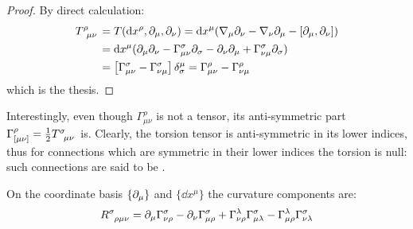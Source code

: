 \begin{proofbox}
  \begin{proof}
    By direct calculation:
    \begin{equation*}
      \begin{split}
        \tensor{T}{^\rho _\mu _\nu}
        &= T(\dd x^\rho, \pa_\mu, \pa_\nu) = \dd x^\mu (\na_\mu \pa_\nu - \na_\nu \pa_\mu - [\pa_\mu, \pa_\nu]) \\
        &= \dd x^\mu (\pa_\mu \pa_\nu - \Gamma^\sigma_{\mu \nu} \pa_\sigma - \pa_\nu \pa_\mu + \Gamma^\sigma_{\nu \mu} \pa_\sigma) \\
        &= \left[ \Gamma^\sigma_{\mu \nu} - \Gamma^\sigma_{\nu \mu} \right] \delta^\mu_\sigma = \Gamma^\rho_{\mu \nu} - \Gamma^\rho_{\nu \mu}
      \end{split}
    \end{equation*}
    which is the thesis.
  \end{proof}
\end{proofbox}

Interestingly, even though $ \Gamma^\rho_{\mu \nu} $ is not a tensor, its anti-symmetric part $ \Gamma^\rho_{[\mu \nu]} = \frac{1}{2} \tensor{T}{^\sigma_\mu _\nu} $ is. Clearly, the torsion tensor is anti-symmetric in its lower indices, thus for connections which are symmetric in their lower indices the torsion is null: such connections are said to be .

\begin{proposition}{}{}
  On the coordinate basis $ \{\partial_\mu\} $ and $ \{\dd x^\mu\} $ the curvature components are:
  \begin{equation}
    \tensor{R}{^\sigma _\rho _\mu _\nu} = \pa_\mu \Gamma^\sigma_{\nu \rho} - \pa_\nu \Gamma^\sigma_{\mu \rho} + \Gamma^\lambda_{\nu \rho} \Gamma^\sigma_{\mu \lambda} - \Gamma^\lambda_{\mu \rho} \Gamma^\sigma_{\nu \lambda}
    \label{eq:riemann-comp}
  \end{equation}
\end{proposition}

